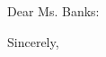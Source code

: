 \documentclass[nosignature,noletterhead]{letter-ur}
\begin{document}
Dear Ms. Banks:



Sincerely,
\end{document}
